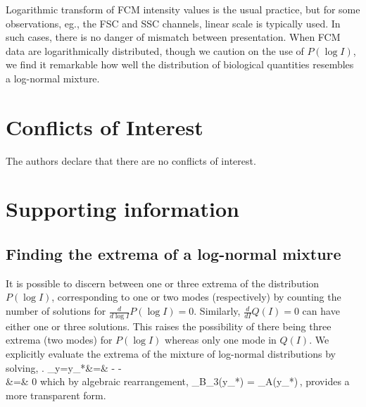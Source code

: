 \documentclass[11pt,a4paper,draft]{article}
\begin{document}
\smallskip 
Logarithmic transform of FCM intensity values is the usual practice, but for some observations, eg., the FSC and SSC channels, linear scale is typically used. In such cases, there is no danger of mismatch between presentation. When FCM data are logarithmically distributed, though we caution on the use of $P(\log I)$, we find it remarkable how well the distribution of biological quantities resembles a log-normal mixture. 

\section*{Conflicts of Interest}
The authors declare that there are no conflicts of interest.


%




\newpage
\section*{Supporting information}
%

\subsection*{Finding the extrema of a log-normal mixture}
It is possible to discern between one or three extrema of the distribution $P(\log I)$, corresponding to one or two modes (respectively) by counting the number of solutions for $\frac{d}{d\log I}P(\log I) = 0$. Similarly, $\frac{d}{dI}Q(I)=0$ can have either one or three solutions. This raises the possibility of there being three extrema (two modes) for $P(\log I)$ whereas only one mode in $Q(I)$. We explicitly evaluate the extrema of the mixture of log-normal distributions by solving,
%
\bea \nonumber
  \left. \right\vert_{y=y_*}&=&
  -    -
    \nonumber\\
  &=& 0\nonumber
\eea
%
which by algebraic rearrangement,
%
\be 
  \label{eq:extremaP}
  _{B_3(y_*)} =
    _{A(y_*)}\,,
\ee
%
provides a more transparent form.  
\end{document}
